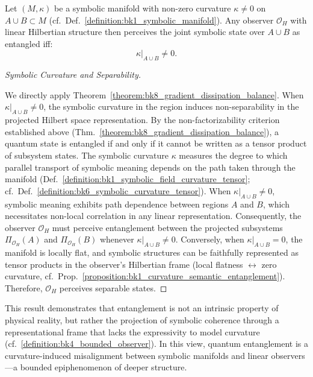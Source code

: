 \begin{corollary}
\label{corollary:bk8_memory_repair_robustness}
Let $(M, \kappa)$ be a symbolic manifold with non-zero curvature
$\kappa \neq 0$ on $A \cup B \subset M$
(cf.~Def.~\ref{definition:bk1_symbolic_manifold}).
Any observer $\mathcal{O}_H$ with linear Hilbertian structure then perceives
the joint symbolic state over $A \cup B$ as entangled iff:
\[
\left. \kappa \right|_{A \cup B} \neq 0.
\]
\end{corollary}
\begin{proof}[Symbolic Curvature and Separability]
\label{proof:bk8_symbolic_curvature_and_separability}
\leavevmode

We directly apply Theorem~\ref{theorem:bk8_gradient_dissipation_balance}. When $\kappa|_{A \cup B} \neq 0$, the symbolic curvature in the region induces non-separability in the projected Hilbert space representation. By the non-factorizability criterion established above (Thm.~\ref{theorem:bk8_gradient_dissipation_balance}), a quantum state is entangled if and only if it cannot be written as a tensor product of subsystem states. 
The symbolic curvature $\kappa$ measures the degree to which parallel transport of symbolic meaning depends on the path taken through the manifold (Def.~\ref{definition:bk1_symbolic_field_curvature_tensor}; cf.~Def.~\ref{definition:bk6_symbolic_curvature_tensor}). When $\kappa|_{A \cup B} \neq 0$, symbolic meaning exhibits path dependence between regions $A$ and $B$, which necessitates non-local correlation in any linear representation.
Consequently, the observer $\mathcal{O}_H$ must perceive entanglement between the projected subsystems $\Pi_{\mathcal{O}_H}(A)$ and $\Pi_{\mathcal{O}_H}(B)$ whenever $\kappa|_{A \cup B} \neq 0$.
Conversely, when $\kappa|_{A \cup B} = 0$, the manifold is locally flat, and symbolic structures can be faithfully represented as tensor products in the observer's Hilbertian frame (local flatness $\leftrightarrow$ zero curvature, cf.~Prop.~\ref{proposition:bk1_curvature_semantic_entanglement}). Therefore, $\mathcal{O}_H$ perceives separable states.
\end{proof}
\begin{remark}
\label{remark:bk8_entanglement_is_observer_bound}
This result demonstrates that entanglement is not an intrinsic property of physical reality, but rather the projection of symbolic coherence through a representational frame that lacks the expressivity to model curvature (cf.~\ref{definition:bk4_bounded_observer}). In this view, quantum entanglement is a curvature-induced misalignment between symbolic manifolds and linear observers—a bounded epiphenomenon of deeper structure.
\end{remark}
